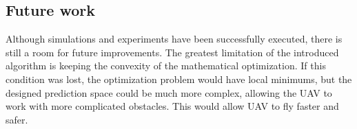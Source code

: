 \documentclass[a4paper,11pt,titlepage]{article}
\begin{document}
\subsection{Future work}
Although simulations and experiments have been successfully executed, there is still a room for future improvements. The greatest limitation of the introduced algorithm is keeping the convexity of the mathematical optimization. If this condition was lost, the optimization problem would have local minimums, but the designed prediction space could be much more complex, allowing the UAV to work with more complicated obstacles. This would allow UAV to fly faster and safer.
\end{document}
